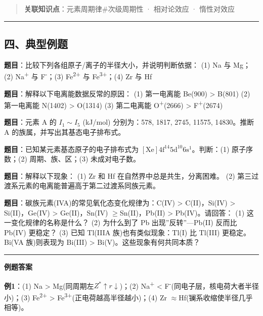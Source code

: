 \documentclass[a4paper,11pt]{ctexart}
\newcommand{\箭}{\ensuremath{\rightarrow}}
\newcommand{\左箭}{\ensuremath{\leftarrow}}
\newcommand{\上箭}{\ensuremath{\uparrow}}
\newcommand{\下箭}{\ensuremath{\downarrow}}
\newcommand{\衡}{\ensuremath{\rightleftharpoons}}
\newcommand{\双箭}{\ensuremath{\leftrightarrow}}
\newcommand{\约等于}{\ensuremath{\approx}}
\newcommand{\小于等于}{\ensuremath{\leq}}
\newcommand{\大于等于}{\ensuremath{\geq}}
\newcommand{\不等于}{\ensuremath{\neq}}
\newcommand{\西格马}{\ensuremath{\sigma}}
\newcommand{\派}{\ensuremath{\pi}}
\begin{document}
\begin{quote}
\textbf{关联知识点}：元素周期律\#次级周期性 · 相对论效应 · 惰性对效应
\end{quote}

\begin{center}\rule{0.5\linewidth}{0.5pt}\end{center}

\subsection{四、典型例题}\label{ux56dbux5178ux578bux4f8bux9898}

\textbf{题目}：比较下列各组原子/离子的半径大小，并说明判断依据：
(1) Na 与 Mg；(2) Na\textsuperscript{+} 与 F\textsuperscript{-}；(3) Fe\textsuperscript{2+} 与 Fe\textsuperscript{3+}；(4) Zr 与 Hf

\textbf{题目}：解释以下电离能数据反常的原因：
(1) 第一电离能 Be(900) \textgreater{} B(801)
(2) 第一电离能 N(1402) \textgreater{} O(1314)
(3) 第二电离能 O\textsuperscript{+}(2666) \textgreater{} F\textsuperscript{+}(2674)

\textbf{题目}：元素 A 的 \(I_1\sim I_5\) (kJ/mol) 分别为：578, 1817, 2745, 11575, 14830。推断 A 的族属，并写出其基态电子排布式。

\textbf{题目}：已知某元素基态原子的电子排布式为 \([\mathrm{Xe}] 4\mathrm{f}^{14} 5\mathrm{d}^{10} 6\mathrm{s}^1\)。判断：(1) 原子序数；(2) 周期、族、区；(3) 未成对电子数。

\textbf{题目}：解释以下现象：
(1) Zr 和 Hf 在自然界中总是共生，分离困难。
(2) 第三过渡系元素的电离能普遍高于第二过渡系同族元素。

\textbf{题目}：碳族元素(IVA)的常见氧化态变化规律为：C(IV) \textgreater{} C(II)，Si(IV) \textgreater{} Si(II)，Ge(IV) \textgreater{} Ge(II)，Sn(IV) \大于等于 Sn(II)，Pb(II) \textgreater{} Pb(IV)。请回答：
(1) 这一变化规律的名称是什么？
(2) 为什么到了 Pb 出现''反转''---Pb(II) 反而比 Pb(IV) 更稳定？
(3) 已知 Tl(IIIA 族)也有类似现象：Tl(I) 比 Tl(III) 更稳定。Bi(VA 族)则表现为 Bi(III) \textgreater{} Bi(V)。这些现象有何共同本质？

\begin{center}\rule{0.5\linewidth}{0.5pt}\end{center}

\textbf{例题答案}

\textbf{例1}：(1) Na \textgreater{} Mg(同周期左 \(Z^*\)\上箭 \(r\)\下箭)；(2) Na\textsuperscript{+} \textless{} F\textsuperscript{-}(同电子层，核电荷大者半径小)；(3) Fe\textsuperscript{2+} \textgreater{} Fe\textsuperscript{3+}(正电荷越高半径越小)；(4) Zr \约等于 Hf(镧系收缩使半径几乎相等)。
\end{document}
